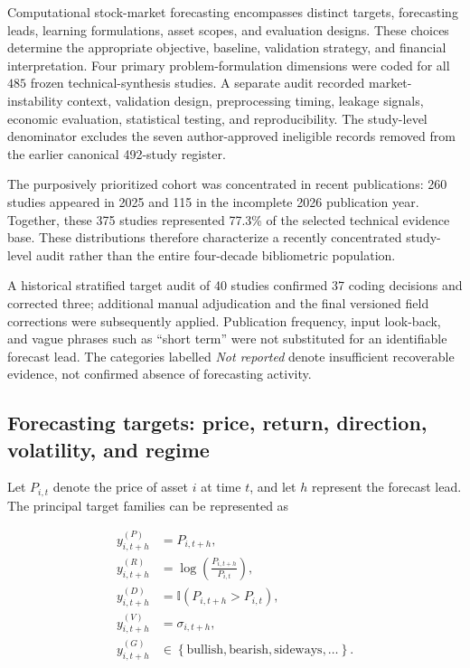 \documentclass[pdflatex,sn-mathphys-num]{sn-jnl}%
\theoremstyle{thmstyleone}%
\theoremstyle{thmstyletwo}%
\theoremstyle{thmstylethree}%
\begin{document}
Computational stock-market forecasting encompasses distinct targets, forecasting
leads, learning formulations, asset scopes, and evaluation designs. These
choices determine the appropriate objective, baseline, validation strategy,
and financial interpretation. Four primary problem-formulation dimensions
were coded for all $485$ frozen technical-synthesis studies. A separate audit
recorded market-instability context, validation design, preprocessing timing,
leakage signals, economic evaluation, statistical testing, and reproducibility.
The study-level denominator excludes the seven author-approved ineligible
records removed from the earlier canonical 492-study register.

The purposively prioritized cohort was concentrated in recent publications:
260 studies appeared in 2025 and 115 in the incomplete 2026 publication
year. Together, these 375 studies represented 77.3\% of the selected
technical evidence base. These distributions therefore characterize a
recently concentrated study-level audit rather than the entire four-decade
bibliometric population.

A historical stratified target audit of 40 studies confirmed 37 coding
decisions and corrected three; additional manual adjudication and the
final versioned field corrections were subsequently applied.
Publication frequency, input look-back, and vague phrases such as
``short term'' were not substituted for an identifiable forecast lead.
The categories labelled \emph{Not reported} denote insufficient
recoverable evidence, not confirmed absence of forecasting activity.

\subsection{Forecasting targets: price, return, direction, volatility, and regime}
\label{subsec:forecasting-targets}

Let \(P_{i,t}\) denote the price of asset \(i\) at time \(t\), and let \(h\)
represent the forecast lead. The principal target families can be represented as

\begin{align}
y^{(P)}_{i,t+h}
    &= P_{i,t+h},
    \label{eq:price-target}\\
y^{(R)}_{i,t+h}
    &= \log\left(\frac{P_{i,t+h}}{P_{i,t}}\right),
    \label{eq:return-target}\\
y^{(D)}_{i,t+h}
    &= \mathbb{I}\left(P_{i,t+h}>P_{i,t}\right),
    \label{eq:direction-target}\\
y^{(V)}_{i,t+h}
    &= \sigma_{i,t+h},
    \label{eq:volatility-target}\\
y^{(G)}_{i,t+h}
    &\in
    \left\{
    \text{bullish},
    \text{bearish},
    \text{sideways},
    \ldots
    \right\}.
    \label{eq:regime-target}
\end{align}
\end{document}

